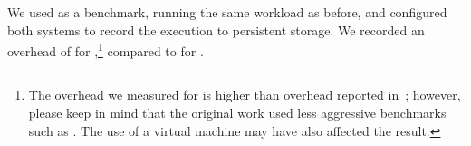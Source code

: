 We used \redis as a benchmark, running the same workload as before,
and configured both systems to record the execution to
persistent storage.  We recorded an overhead of \redisRROvhScribe for
\scribe,\footnote{The overhead we measured for \scribe
is higher than overhead reported in~\cite{scribe}; however, please keep in
mind that the original work used less aggressive benchmarks such as \httpd.
The use of a virtual machine may have also affected the result.}
compared to \redisRROvhNx for \nx.

